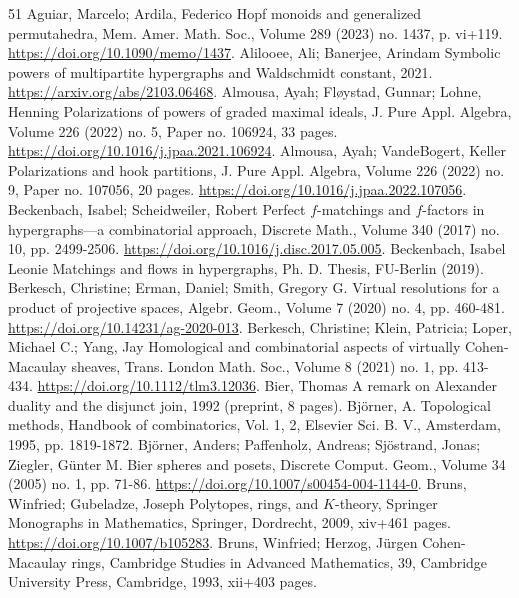 \begin{thebibliography}{51}
 Aguiar, Marcelo; Ardila, Federico Hopf monoids and generalized permutahedra, Mem. Amer. Math. Soc., Volume 289 (2023) no. 1437, p. vi+119. \url{https://doi.org/10.1090/memo/1437}.
 Alilooee, Ali; Banerjee, Arindam Symbolic powers of multipartite hypergraphs and Waldschmidt constant, 2021. \url{https://arxiv.org/abs/2103.06468}.
 Almousa, Ayah; Fløystad, Gunnar; Lohne, Henning Polarizations of powers of graded maximal ideals, J. Pure Appl. Algebra, Volume 226 (2022) no. 5, Paper no. 106924, 33 pages. \url{https://doi.org/10.1016/j.jpaa.2021.106924}.
 Almousa, Ayah; VandeBogert, Keller Polarizations and hook partitions, J. Pure Appl. Algebra, Volume 226 (2022) no. 9, Paper no. 107056, 20 pages. \url{https://doi.org/10.1016/j.jpaa.2022.107056}.
 Beckenbach, Isabel; Scheidweiler, Robert Perfect $f$-matchings and $f$-factors in hypergraphs—a combinatorial approach, Discrete Math., Volume 340 (2017) no. 10, pp. 2499-2506. \url{https://doi.org/10.1016/j.disc.2017.05.005}.
 Beckenbach, Isabel Leonie Matchings and flows in hypergraphs, Ph. D. Thesis, FU-Berlin (2019).
 Berkesch, Christine; Erman, Daniel; Smith, Gregory G. Virtual resolutions for a product of projective spaces, Algebr. Geom., Volume 7 (2020) no. 4, pp. 460-481. \url{https://doi.org/10.14231/ag-2020-013}.
 Berkesch, Christine; Klein, Patricia; Loper, Michael C.; Yang, Jay Homological and combinatorial aspects of virtually Cohen-Macaulay sheaves, Trans. London Math. Soc., Volume 8 (2021) no. 1, pp. 413-434. \url{https://doi.org/10.1112/tlm3.12036}.
 Bier, Thomas A remark on Alexander duality and the disjunct join, 1992 (preprint, 8 pages).
 Björner, A. Topological methods, Handbook of combinatorics, Vol. 1, 2, Elsevier Sci. B. V., Amsterdam, 1995, pp. 1819-1872.
 Björner, Anders; Paffenholz, Andreas; Sjöstrand, Jonas; Ziegler, Günter M. Bier spheres and posets, Discrete Comput. Geom., Volume 34 (2005) no. 1, pp. 71-86. \url{https://doi.org/10.1007/s00454-004-1144-0}.
 Bruns, Winfried; Gubeladze, Joseph Polytopes, rings, and ${K}$-theory, Springer Monographs in Mathematics, Springer, Dordrecht, 2009, xiv+461 pages. \url{https://doi.org/10.1007/b105283}.
 Bruns, Winfried; Herzog, Jürgen Cohen-Macaulay rings, Cambridge Studies in Advanced Mathematics, 39, Cambridge University Press, Cambridge, 1993, xii+403 pages.

\end{thebibliography}
